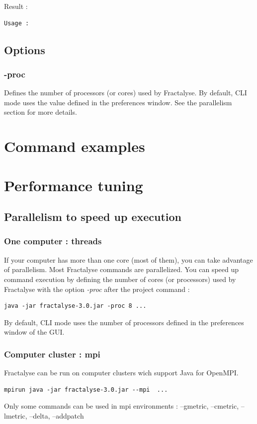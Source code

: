 \documentclass[a4paper,10pt]{report}
\begin{document}
Result :
\begin{Verbatim}
Usage :

\end{Verbatim}


\section{Options}

\subsection{-proc}
Defines the number of processors (or cores) used by Fractalyse.
By default, CLI mode uses the value defined in the preferences window.
See the parallelism section for more details.


\chapter{Command examples}




\chapter{Performance tuning}
\section{Parallelism to speed up execution}
\subsection{One computer : threads}
If your computer has more than one core (most of them), you can take advantage of parallelism. 
Most Fractalyse commands are parallelized. You can speed up command execution by defining the number
of cores (or processors) used by Fractalyse with the option \textit{-proc} after the project command :
\begin{Verbatim}
java -jar fractalyse-3.0.jar -proc 8 ...
\end{Verbatim}
By default, CLI mode uses the number of processors defined in the preferences window of the GUI.
\subsection{Computer cluster : mpi}
Fractalyse can be run on computer clusters wich support Java for OpenMPI.
\begin{Verbatim}
mpirun java -jar fractalyse-3.0.jar --mpi  ...
\end{Verbatim}
Only some commands can be used in mpi environments : --gmetric, --cmetric, --lmetric, --delta, --addpatch
\end{document}
